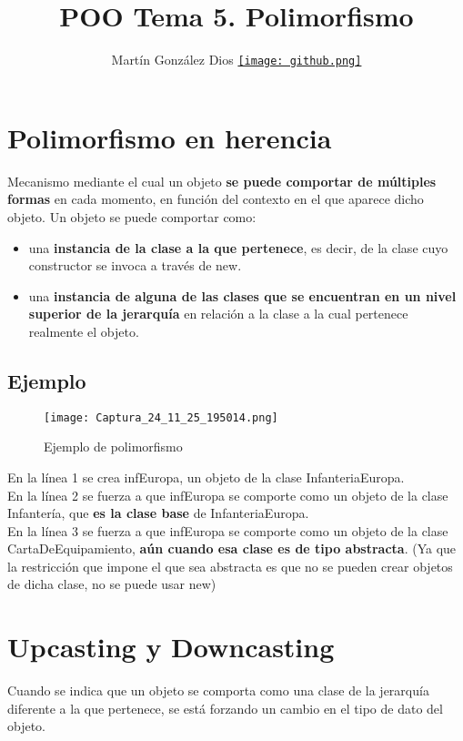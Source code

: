 \documentclass{article}
\title{POO Tema 5. Polimorfismo}
\author{Martín González Dios 
\href{https://github.com/martindios}{\texttt{[image: github.png]}}}
\begin{document}
\maketitle

\section{Polimorfismo en herencia}
Mecanismo mediante el cual un objeto \textbf{se puede comportar de múltiples formas} en cada momento, en función del contexto en el que aparece dicho objeto. 
Un objeto se puede comportar como:
\begin{itemize}
    \item una \textbf{instancia de la clase a la que pertenece}, es decir, de la clase cuyo constructor se invoca a través de new.
    \item una \textbf{instancia de alguna de las clases que se encuentran en un nivel superior de la jerarquía} en relación a la clase a la cual pertenece realmente el objeto.
\end{itemize}

\subsection{Ejemplo}
\begin{figure}[h]
    \centering
    \texttt{[image: Captura\_24\_11\_25\_195014.png]}
    \caption{Ejemplo de polimorfismo}
\end{figure}

En la línea 1 se crea infEuropa, un objeto de la clase InfanteriaEuropa. \\
En la línea 2 se fuerza a que infEuropa se comporte como un objeto de la clase Infantería, que \textbf{es la clase base} de InfanteriaEuropa. \\
En la línea 3 se fuerza a que infEuropa se comporte como un objeto de la clase CartaDeEquipamiento, \textbf{aún cuando esa clase es de tipo abstracta}. (Ya que la restricción que impone el que sea abstracta es que no se pueden crear objetos de dicha clase, no se puede usar new)

\section{Upcasting y Downcasting}
Cuando se indica que un objeto se comporta como una clase de la jerarquía diferente a la que pertenece, se está forzando un cambio en el tipo de dato del objeto. 
\end{document}
